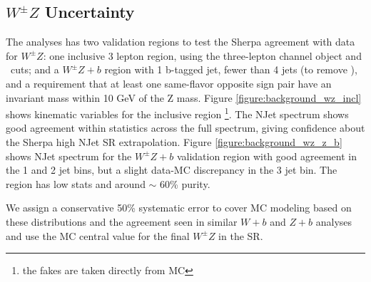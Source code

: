 \subsection{$W^{\pm}Z$ Uncertainty} 
The \tth analyses has two validation regions to test the Sherpa agreement with data for $W^{\pm}Z$: one inclusive 3 lepton region, using the three-lepton channel object and \pt\ cuts; and a $W^{\pm}Z+b$ region with 1 b-tagged jet, fewer than 4 jets (to remove \ttV), and a requirement that at least one same-flavor opposite sign pair have an invariant mass within 10 GeV of the Z mass. Figure \ref{figure:background_wz_incl} shows kinematic variables for the inclusive region \footnote{the fakes are taken directly from MC}. The NJet spectrum shows good agreement within statistics across the full spectrum, giving confidence about the Sherpa high NJet SR extrapolation. Figure \ref{figure:background_wz_z_b} shows NJet spectrum for the $W^{\pm}Z+b$ validation region with good agreement in the 1 and 2 jet bins, but a slight data-MC discrepancy in the 3 jet bin. The region has low stats and around $\sim$ 60\% purity. 

We assign a conservative 50\% systematic error to cover MC modeling based on these distributions and the agreement seen in similar $W+b$ and $Z+b$ analyses and use the MC central value for the final $W^{\pm}Z$ in the SR. 

